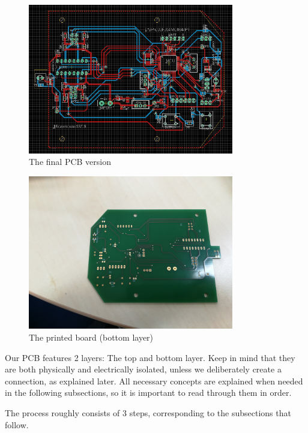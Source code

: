 \begin{figure}[htb]
    \centering
    \includegraphics[width=0.8\textwidth]{figures/hardware/PCB.PNG}
    \caption{The final PCB version}
    \label{fig:pcb}
\end{figure}

\begin{figure}[htb]
    \centering
    \includegraphics[width=0.8\textwidth]{figures/hardware/printed.jpg}
    \caption{The printed board (bottom layer)}
    \label{fig:print}
\end{figure}

Our PCB features 2 layers: The top and bottom layer. Keep in mind that they are both physically and electrically isolated, unless we deliberately create a connection, as explained later. All necessary concepts are explained when needed in the following subsections, so it is important to read through them in order.

The process roughly consists of 3 steps, corresponding to the subsections that follow.

\FloatBarrier

